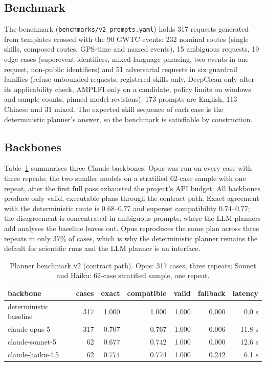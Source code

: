 \documentclass[twocolumn]{aastex631}
\begin{document}
\subsection{Benchmark}
The benchmark (\texttt{benchmarks/v2\_prompts.yaml}) holds 317 requests
generated from templates crossed with the 90 GWTC events: 232 nominal
routes (single skills, composed routes, GPS-time and named events), 15
ambiguous requests, 19 edge cases (superevent identifiers, mixed-language
phrasing, two events in one request, non-public identifiers) and 51
adversarial requests in six guardrail families (refuse unbounded requests,
registered skills only, DeepClean only after its applicability check,
AMPLFI only on a candidate, policy limits on windows and sample counts,
pinned model revisions). 173 prompts are English, 113 Chinese and 31
mixed. The expected skill sequence of each case is the deterministic
planner's answer, so the benchmark is satisfiable by construction.

\subsection{Backbones}
Table~\ref{tab:planner} summarises three Claude backbones. Opus was run on
every case with three repeats; the two smaller models on a stratified
62-case sample with one repeat, after the first full pass exhausted the
project's API budget. All backbones produce only valid, executable plans
through the contract path. Exact agreement with the deterministic route is
0.68--0.77 and superset compatibility 0.74--0.77; the disagreement is
concentrated in ambiguous prompts, where the LLM planners add analyses the
baseline leaves out. Opus reproduces the same plan across three repeats in
only 37\% of cases, which is why the deterministic planner remains the
default for scientific runs and the LLM planner is an interface.

\begin{table}
\centering
\caption{Planner benchmark v2 (contract path). Opus: 317 cases, three
repeats; Sonnet and Haiku: 62-case stratified sample, one repeat.}
\label{tab:planner}
\begin{tabular}{lrrrrrr}
\toprule
backbone & cases & exact & compatible & valid & fallback & latency \\
\midrule
deterministic baseline & 317 & 1.000 & 1.000 & 1.000 & 0.000 & 0.0 s \\
claude-opus-5 & 317 & 0.707 & 0.767 & 1.000 & 0.006 & 11.8 s \\
claude-sonnet-5 & 62 & 0.677 & 0.742 & 1.000 & 0.000 & 12.6 s \\
claude-haiku-4.5 & 62 & 0.774 & 0.774 & 1.000 & 0.242 & 6.1 s \\
\bottomrule
\end{tabular}
\end{table}
\end{document}
